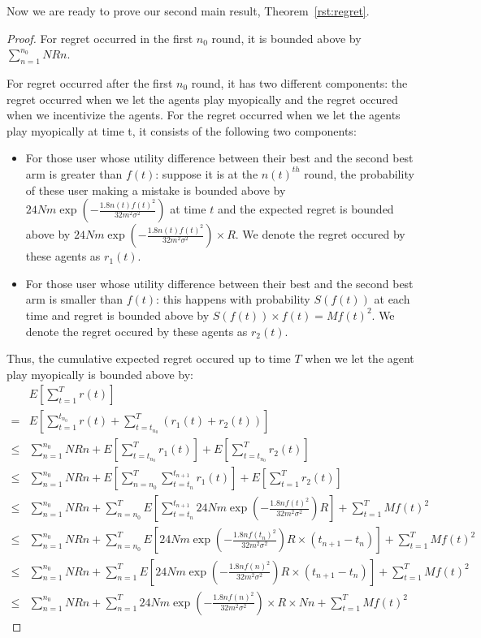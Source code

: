 \documentclass{article}
\begin{document}
Now we are ready to prove our second main result, Theorem~\ref{rst:regret}.

\begin{proof}
For regret occurred in the first $n_0$ round, it is bounded above by $\sum_{n=1}^{n_{0}}NRn$.

For regret occurred after the first $n_0$ round, it has two different components: the regret occurred when we let the agents play myopically and the regret occured when we incentivize the agents. For the regret occurred when we let the agents play myopically at time t, it consists of the following two components:
\begin{itemize}
\item For those user whose utility difference between their best and the second best arm is greater than $f(t)$: suppose it is at the $n(t)^{th}$ round, the probability of these user making a mistake is bounded above by $24Nm\exp\left(-\frac{1.8n(t) f(t)^2}{32 m^2\sigma^2}\right)$ at time $t$ and the expected regret is bounded above by $24Nm\exp\left(-\frac{1.8n(t) f(t)^2}{32 m^2\sigma^2}\right)\times R$. We denote the regret occured by these agents as $r_1(t)$.
\item For those user whose utility difference between their best and the second best arm is smaller than $f(t)$: this happens with probability $S(f(t))$ at each time and regret is bounded above by $S(f(t)) \times f(t)=Mf(t)^2$. We denote the regret occured by these agents as $r_2(t)$.
\end{itemize}

Thus, the cumulative expected regret occured up to time $T$ when we let the agent play myopically is bounded above by:
\begin{align}
&E\left[\sum_{t=1}^{T}r(t)\right] \nonumber \\
=&E\left[\sum_{t=1}^{t_{n_{0}}} r(t) + \sum_{t=t_{n_{0}}}^{T}(r_1(t)+r_2(t))\right]  \nonumber \\
\leq & \sum_{n=1}^{n_{0}}NRn + E\left[\sum_{t=t_{n_{0}}}^{T}r_1(t)\right]+ E\left[\sum_{t=t_{n_{0}}}^{T}r_2(t)\right] \nonumber \\
\leq & \sum_{n=1}^{n_{0}}NRn + E\left[\sum_{n=n_{0}}^{T}\sum_{t=t_{n}}^{t_{n+1}}r_1(t)\right]+ E\left[\sum_{t=1}^{T}r_2(t)\right] \nonumber \\
\leq & \sum_{n=1}^{n_{0}}NRn + \sum_{n=n_{0}}^{T}E\left[\sum_{t=t_{n}}^{t_{n+1}}24Nm\exp\left(-\frac{1.8n f(t)^2}{32 m^2\sigma^2}\right) R\right]+ \sum_{t=1}^{T}Mf(t)^2 \nonumber \\
\leq & \sum_{n=1}^{n_{0}}NRn + \sum_{n=n_{0}}^{T}E\left[24Nm\exp\left(-\frac{1.8n f(t_n)^2}{32 m^2\sigma^2}\right)R \times (t_{n+1}-t_{n})\right]+ \sum_{t=1}^{T}Mf(t)^2 \nonumber \\
\leq & \sum_{n=1}^{n_{0}}NRn + \sum_{n=1}^{T}E\left[24Nm\exp\left(-\frac{1.8n f(n)^2}{32 m^2\sigma^2}\right)R\times (t_{n+1}-t_{n})\right]+ \sum_{t=1}^{T}Mf(t)^2 \nonumber \\
\leq & \sum_{n=1}^{n_{0}}NRn + \sum_{n=1}^{T} 24Nm\exp\left(-\frac{1.8n f(n)^2}{32 m^2\sigma^2}\right)\times R \times Nn+ \sum_{t=1}^{T}Mf(t)^2 \label{equ:regret}
\end{align}


\end{proof}
\end{document}
